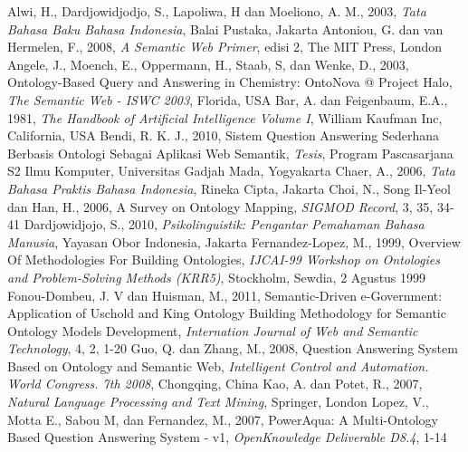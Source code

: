 \begin{thebibliography}{99}
		Alwi, H., Dardjowidjodjo, S., Lapoliwa, H dan Moeliono, A. M., 2003, \emph{Tata Bahasa Baku Bahasa Indonesia}, Balai Pustaka, Jakarta
		Antoniou, G. dan van Hermelen, F., 2008, \emph{A Semantic Web Primer}, edisi 2, The MIT Press, London
		Angele, J., Moench, E., Oppermann, H., Staab, S, dan Wenke, D., 2003, Ontology-Based Query and Answering in Chemistry: OntoNova @ Project Halo, \emph{The Semantic Web - ISWC 2003}, Florida, USA
		Bar, A. dan Feigenbaum, E.A., 1981, \emph{The Handbook of Artificial Intelligence Volume I}, William Kaufman Inc, California, USA
		Bendi, R. K. J., 2010, Sistem Question Answering Sederhana Berbasis Ontologi Sebagai Aplikasi Web Semantik, \emph{Tesis}, Program Pascasarjana S2 Ilmu Komputer, Universitas Gadjah Mada, Yogyakarta
		Chaer, A., 2006, \emph{Tata Bahasa Praktis Bahasa Indonesia}, Rineka Cipta, Jakarta
		Choi, N., Song Il-Yeol dan Han, H., 2006, A Survey on Ontology Mapping, \emph{SIGMOD Record}, 3, 35, 34-41
		Dardjowidjojo, S., 2010, \emph{Psikolinguistik: Pengantar Pemahaman Bahasa Manusia}, Yayasan Obor Indonesia, Jakarta
		Fernandez-Lopez, M., 1999, Overview Of Methodologies For Building Ontologies, \emph{IJCAI-99 Workshop on Ontologies and Problem-Solving Methods (KRR5)}, Stockholm, Sewdia, 2 Agustus 1999
		Fonou-Dombeu, J. V dan Huisman, M., 2011, Semantic-Driven e-Government: Application of Uschold and King Ontology Building Methodology for Semantic Ontology Models Development, \emph{Internation Journal of Web and Semantic Technology}, 4, 2, 1-20
		Guo, Q. dan Zhang, M., 2008, Question Answering System Based on Ontology and Semantic Web, \emph{Intelligent Control and Automation. World Congress. 7th 2008}, Chongqing, China
		Kao, A. dan Potet, R., 2007, \emph{Natural Language Processing and Text Mining}, Springer, London
		Lopez, V., Motta E., Sabou M, dan Fernandez, M., 2007, PowerAqua: A Multi-Ontology Based Question Answering System - v1, \emph{OpenKnowledge Deliverable D8.4}, 1-14

\end{thebibliography}
